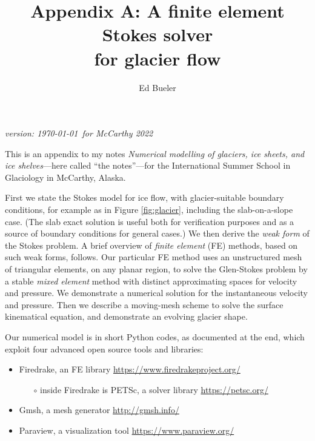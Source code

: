 \documentclass[letterpaper,final,12pt,reqno]{amsart}
\begin{document}
\graphicspath{{figures/}}

\title[Appendix A]{Appendix A: A finite element Stokes solver \\ for glacier flow}

\author{Ed Bueler}

\maketitle

\vspace{-8mm}
\begin{center}
\footnotesize
\emph{version: \today~for McCarthy 2022}
\end{center}

\thispagestyle{empty}
\bigskip

\renewcommand{\thefigure}{A\arabic{figure}}
\renewcommand{\theequation}{A\arabic{equation}}
\renewcommand{\thesection}{A.\arabic{section}}

This is an appendix to my notes \emph{Numerical modelling of glaciers, ice sheets, and ice shelves}---here called ``the notes''---for the International Summer School in Glaciology in McCarthy, Alaska.

First we state the Stokes model for ice flow, with glacier-suitable boundary conditions, for example as in Figure \ref{fig:glacier}, including the slab-on-a-slope case.  (The slab exact solution is useful both for verification purposes and as a source of boundary conditions for general cases.)  We then derive the \emph{weak form} of the Stokes problem.  A brief overview of \emph{finite element} (FE) methods, based on such weak forms, follows.  Our particular FE method uses an unstructured mesh of triangular elements, on any planar region, to solve the Glen-Stokes problem by a stable \emph{mixed element} method with distinct approximating spaces for velocity and pressure.  We demonstrate a numerical solution for the instantaneous velocity and pressure.  Then we describe a moving-mesh scheme to solve the surface kinematical equation, and demonstrate an evolving glacier shape.

Our numerical model is in short Python codes, as documented at the end, which exploit four advanced open source tools and libraries:
\begin{itemize}
\item Firedrake, an FE library \hfill \url{https://www.firedrakeproject.org/}
    \begin{itemize}
    \item[$\circ$] inside Firedrake is PETSc, a solver library \hfill \url{https://petsc.org/}
    \end{itemize}
\item Gmsh, a mesh generator \hfill \url{http://gmsh.info/}
\item Paraview, a visualization tool \hfill \url{https://www.paraview.org/}
\end{itemize}
\end{document}
